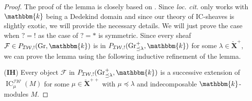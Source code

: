 \documentclass{amsart}
\renewcommand{\k}{\mathbbm{k}}
\newcommand{\scrF}{\mathcal{F}}
\newcommand{\bfXv}{\check{\mathbf{X}}}
\newcommand{\IW}{\mathcal{IW}}
\DeclareMathOperator{\IC}{IC}
\DeclareMathOperator{\Gr}{Gr}
\theoremstyle{definition}
\begin{document}
    \begin{proof}
        The proof of the lemma is closely based on \cite[Lemma 2.1.4]{RSW}. Since \emph{loc. cit.} only works with $\k$ being a Dedekind domain and since our theory of IC-sheaves is slightly exotic, we will provide the necessary details.
        We will just prove the case when $? = !$ as the case of $? = *$ is symmetric.
        Since every sheaf $\scrF \in P_{\IW, !} (\Gr, \k)$ is in $P_{\IW, !} (\Gr_{\preceq \lambda}^+, \k)$ for some $\lambda \in \bfXv^{+}$, we can prove the lemma using the following inductive refinement of the lemma.

        (\textbf{IH}) Every object $\scrF$ in $P_{\IW, !} (\Gr_{\preceq \lambda}^+, \k)$ is a successive extension of $\IC_{\mu}^{\IW} (M)$ for some $\mu \in \bfXv^{++}$ with $\mu \preceq \lambda$ and indecomposable $\k$-modules $M$.
        

\end{proof}
\end{document}
